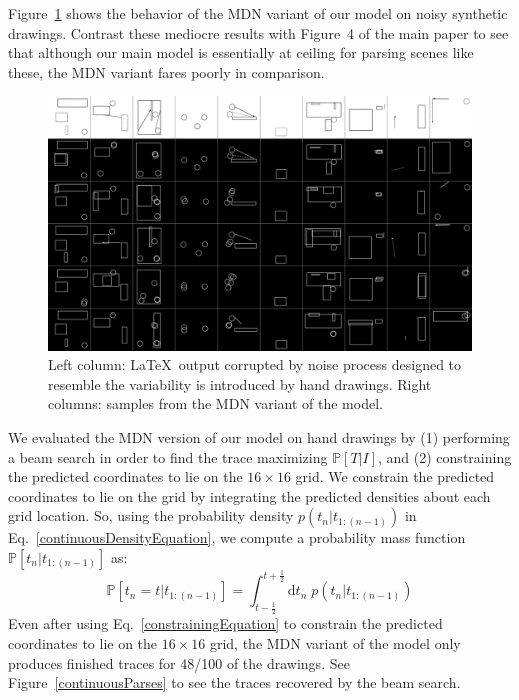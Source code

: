 \documentclass{article}
\newcommand{\probability}{\mathds{P}} %
\begin{document}
Figure~\ref{syntheticContinuous}  shows the behavior of the MDN variant of our model on noisy synthetic drawings.
Contrast these mediocre results with Figure~4 of the main paper to see that although
our main model is essentially at ceiling for parsing scenes like these,
the MDN variant fares poorly in comparison.
\begin{figure}
  \includegraphics[width = \textwidth]{figures/syntheticContinuous.png}
  \caption{Left column: \LaTeX~output corrupted by noise process designed to resemble the variability is introduced by hand drawings. Right columns: samples from the MDN variant of the model.}\label{syntheticContinuous}
\end{figure}

We evaluated the MDN version of our model on hand drawings by (1)
performing a beam search in order to find the trace maximizing
$\probability [T|I]$, and (2) constraining the predicted coordinates
to lie on the $16\times 16$ grid. We constrain the predicted coordinates
to lie on the grid by integrating the predicted densities about each grid location.
So, using the probability density $p(t_n|t_{1:(n - 1)})$ in Eq.~\ref{continuousDensityEquation},
we compute a probability mass function $\probability [t_n|t_{1:(n - 1)}]$ as:
\begin{equation}
  \probability [t_n = t|t_{1:(n - 1)}] = \int_{t - \frac{1}{2}}^{t + \frac{1}{2}} \mathrm{d}t_n \; p(t_n|t_{1:(n - 1)})\label{constrainingEquation}
\end{equation}
Even after using Eq.~\ref{constrainingEquation} to constrain the predicted coordinates to lie on the $16\times 16$ grid, the MDN variant of the model only produces finished traces for 48/100 of the drawings.
See Figure~\ref{continuousParses} to see the traces recovered by the beam search.
\end{document}
